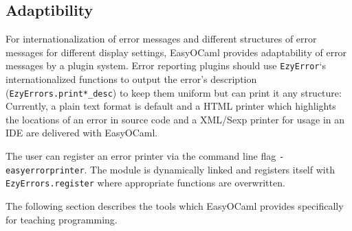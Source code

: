 \subsection{Adaptibility}
\label{hd003002}
For internationalization of error messages and different structures of error
messages for different display settings, EasyOCaml provides adaptability of
error messages by a plugin system.  Error reporting plugins should use
\texttt{EzyError}`s internationalized functions to output the error's
description (\texttt{EzyErrors.print*\_desc}) to keep them uniform but can
print it any structure:  Currently, a plain text format is default and a HTML
printer which highlights the locations of an error in source code and a
XML/Sexp printer for usage in an IDE are delivered with EasyOCaml.

The user can register an error printer via the command line flag 
\texttt{-easyerrorprinter}.  The module is dynamically linked and 
registers itself with \texttt{EzyErrors.register} where appropriate 
functions are overwritten.

The following section describes the tools which EasyOCaml provides 
specifically for teaching programming.

